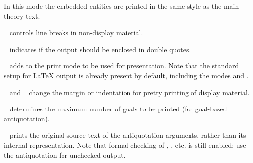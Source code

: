 \begin{isabellebody}
\begin{isamarkuptext}
\begin{description}
  In this mode the embedded entities are printed in the same style as
  the main theory text.

  \item {}\hypertarget{antiquotation option.break}{\hyperlink{antiquotation option.break}{\mbox{}}}~ controls
  line breaks in non-display material.

  \item {}\hypertarget{antiquotation option.quotes}{\hyperlink{antiquotation option.quotes}{\mbox{}}}~ indicates
  if the output should be enclosed in double quotes.

  \item {}\hypertarget{antiquotation option.mode}{\hyperlink{antiquotation option.mode}{\mbox{}}}~ adds  to the print mode to be used for presentation.  Note that the
  standard setup for {\LaTeX} output is already present by default,
  including the modes  and .

  \item {}\hypertarget{antiquotation option.margin}{\hyperlink{antiquotation option.margin}{\mbox{}}}~ and
  \hypertarget{antiquotation option.indent}{\hyperlink{antiquotation option.indent}{\mbox{}}}~ change the margin
  or indentation for pretty printing of display material.

  \item {}\hypertarget{antiquotation option.goals-limit}{\hyperlink{antiquotation option.goals-limit}{\mbox{}}}~
  determines the maximum number of goals to be printed (for goal-based
  antiquotation).

  \item {}\hypertarget{antiquotation option.source}{\hyperlink{antiquotation option.source}{\mbox{}}}~ prints the
  original source text of the antiquotation arguments, rather than its
  internal representation.  Note that formal checking of
  \hyperlink{antiquotation.thm}{\mbox{}}, \hyperlink{antiquotation.term}{\mbox{}}, etc. is still
  enabled; use the \hyperlink{antiquotation.text}{\mbox{}} antiquotation for unchecked
  output.


\end{description}
\end{isamarkuptext}
\end{isabellebody}
